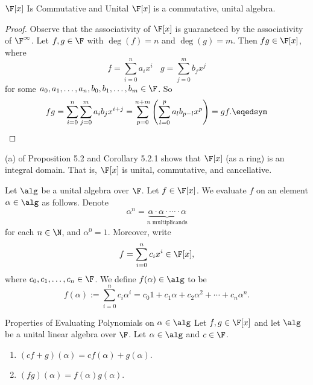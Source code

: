\documentclass[linearalgebra]{subfiles}
\begin{document}
    \begin{cor}{$\F[x]$ Is Commutative and Unital}
        $\F[x]$ is a commutative, unital algebra.
    \end{cor}	

    \begin{proof}
        Observe that the associativity of $\F[x]$ is guaraneteed by the associativity of $\F^\infty$. Let $f,g\in \F$ with $\deg(f) = n$ and $\deg(g) = m$. Then $fg\in \F[x]$, where
        \begin{equation*}
            f = \sum^n_{i=0} a_ix^i \ \ \ \ g = \sum^m_{j=0} b_jx^j 
        \end{equation*}
        for some $a_0, a_1, \ldots, a_n, b_0, b_1, \ldots, b_m\in \F$. So
        \begin{equation*}
            fg = \sum^n_{i=0}\sum^m_{j=0} a_ib_jx^{i+j} = \sum^{n+m}_{p=0} \left( \sum^p_{l=0} a_lb_{p-l}x^p \right) = gf. \eqedsym
        \end{equation*}
    \end{proof}

    \begin{remark}
        (a) of Proposition 5.2 and Corollary 5.2.1 shows that $\F[x]$ (as a ring) is an integral domain. That is, $\F[x]$ is unital, commutative, and cancellative.
    \end{remark}

    \begin{remark}
        Let $\alg$ be a unital algebra over $\F$. Let $f\in \F[x]$. We evaluate $f$ on an element $\alpha\in \alg$ as follows. Denote
        \begin{equation*}
            \alpha^n = \underbrace{\alpha\cdot\alpha\cdot\cdots\cdot\alpha}_{n\text{ multiplicands}}
        \end{equation*}
        for each $n\in \N$, and $\alpha^0 = 1$. Moreover, write
        \begin{equation*}
            f = \sum^n_{i=0} c_ix^i\in \F[x],
        \end{equation*}
        where $c_0, c_1, \ldots, c_n\in\F$. We define $f(\alpha)\in\alg$ to be
        \begin{equation*}
            f(\alpha) := \sum^n_{i=0} c_i\alpha^i = c_0 1 + c_1\alpha + c_2\alpha^2 + \cdots + c_n\alpha^n.
        \end{equation*}
    \end{remark}

    \begin{prop}{Properties of Evaluating Polynomials on $\alpha\in\alg$}
        Let $f,g\in \F[x]$ and let $\alg$ be a unital linear algebra over $\F$. Let $\alpha\in \alg$ and $c\in\F$.
        \begin{enumerate}
            \item $(cf+g)(\alpha) = cf(\alpha)+g(\alpha)$.
            \item $(fg)(\alpha) = f(\alpha)g(\alpha)$.
        \end{enumerate}
    \end{prop}
\end{document}
